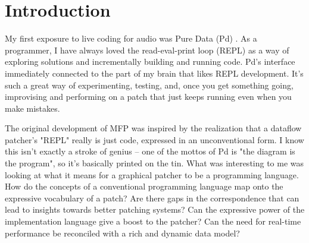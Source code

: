 \documentclass[a4paper]{article}
\title{\papertitle}
\affiliation{ \paperauthorA}
{{\tt \href{mailto:grib@billgribble.com}{grib@billgribble.com}}}
\newif\ifpdf
\begin{document}
\ifpdf %
  \DeclareGraphicsExtensions{.png,.jpg,.pdf}
\else  %
\fi

\maketitle

\begin{abstract}
MFP is a graphical patching system distinguished by the ready
availability of Python data types and operations in patches.
Recent work has added support for live coding of
message-processing patch elements in Python, and of
signal-processing patch elements in Faust.  Its extensibility
and rich set of message data types give MFP some nice
capabilities for interactive patching.
\end{abstract}

\section{Introduction}
\label{sec:intro}

My first exposure to live coding for audio was Pure Data (Pd)
\cite{Puck:PureData}. As a programmer, I have always loved the
read-eval-print loop (REPL) as a way of exploring solutions and
incrementally building and running code. Pd's interface
immediately connected to the part of my brain that likes REPL
development. It's such a great way of experimenting, testing,
and, once you get something going, improvising and performing on
a patch that just keeps running even when you make mistakes.

The original development of MFP was inspired by the realization
that a dataflow patcher's "REPL" really is just code, expressed
in an unconventional form. I know this isn't exactly a stroke of
genius -- one of the mottos of Pd is "the diagram is the
program", so it's basically printed on the tin. What was
interesting to me was looking at what it means for a graphical
patcher to be a programming language. How do the concepts of a
conventional programming language map onto the expressive
vocabulary of a patch? Are there gaps in the correspondence that
can lead to insights towards better patching systems? Can the
expressive power of the implementation language give a boost to
the patcher? Can the need for real-time performance be reconciled
with a rich and dynamic data model?
\end{document}
